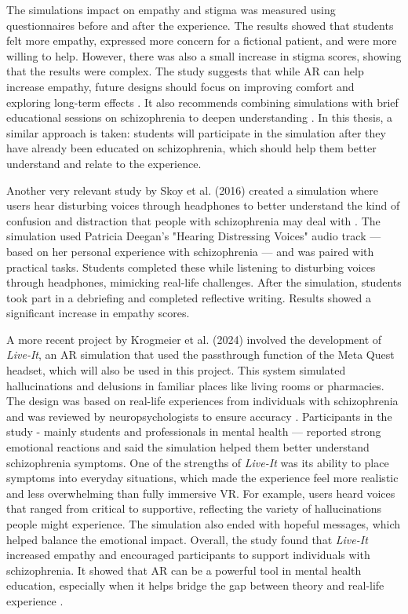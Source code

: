 The simulations impact on empathy and stigma was measured using questionnaires before and after the experience. The results showed that students felt more empathy, expressed more concern for a fictional patient, and were more willing to help. However, there was also a small increase in stigma scores, showing that the results were complex. The study suggests that while AR can help increase empathy, future designs should focus on improving comfort and exploring long-term effects \cite{Silva2017}. It also recommends combining simulations with brief educational sessions on schizophrenia to deepen understanding \cite{Silva2017}. In this thesis, a similar approach is taken: students will participate in the simulation after they have already been educated on schizophrenia, which should help them better understand and relate to the experience.

Another very relevant study by Skoy et al. (2016) created a simulation where users hear disturbing voices through headphones to better understand the kind of confusion and distraction that people with schizophrenia may deal with \cite{Skoy2016}. The simulation used Patricia Deegan's "Hearing Distressing Voices" audio track — based on her personal experience with schizophrenia — and was paired with practical tasks. Students completed these while listening to disturbing voices through headphones, mimicking real-life challenges. After the simulation, students took part in a debriefing and completed reflective writing. Results showed a significant increase in empathy scores.

A more recent project by Krogmeier et al. (2024) involved the development of \textit{Live-It}, an AR simulation that used the passthrough function of the Meta Quest headset, which will also be used in this project. This system simulated hallucinations and delusions in familiar places like living rooms or pharmacies. The design was based on real-life experiences from individuals with schizophrenia and was reviewed by neuropsychologists to ensure accuracy \cite{Krogmeier2024}. Participants in the study - mainly students and professionals in mental health — reported strong emotional reactions and said the simulation helped them better understand schizophrenia symptoms. One of the strengths of \textit{Live-It} was its ability to place symptoms into everyday situations, which made the experience feel more realistic and less overwhelming than fully immersive VR. For example, users heard voices that ranged from critical to supportive, reflecting the variety of hallucinations people might experience. The simulation also ended with hopeful messages, which helped balance the emotional impact. Overall, the study found that \textit{Live-It} increased empathy and encouraged participants to support individuals with schizophrenia. It showed that AR can be a powerful tool in mental health education, especially when it helps bridge the gap between theory and real-life experience \cite{Krogmeier2024}.

